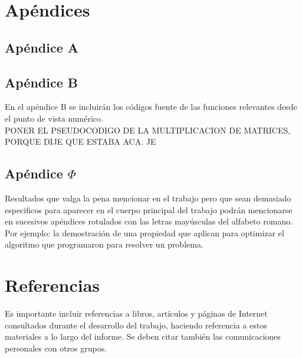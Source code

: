 \documentclass[a4paper]{article}
\begin{document}
\newpage
\section{Ap\'endices}
	\subsection{Ap\'endice A}
%		
\newpage
	\subsection{Ap\'endice B}
En el ap\'endice B se incluir\'an los c\'odigos fuente de las funciones relevantes desde el punto de vista num\'erico.\\
PONER EL PSEUDOCODIGO DE LA MULTIPLICACION DE MATRICES, PORQUE DIJE QUE ESTABA ACA. JE
	\subsection{Ap\'endice $\Phi$}
 Resultados que valga la pena mencionar en el trabajo pero que sean demasiado especificos para
aparecer en el cuerpo principal del trabajo podr\'an mencionarse en sucesivos ap\'endices
rotulados con las letras may\'usculas del alfabeto romano. Por ejemplo: la demostraci\'on
de una propiedad que aplican para optimizar el algoritmo que programaron para resolver
un problema.


\newpage
\section{Referencias}
Es importante incluir referencias a libros, art\'iculos y p\'aginas de Internet consultados
durante el desarrollo del trabajo, haciendo referencia a estos materiales a lo largo del
informe. Se deben citar tambi\'en las comunicaciones personales con otros grupos.
\end{document}
